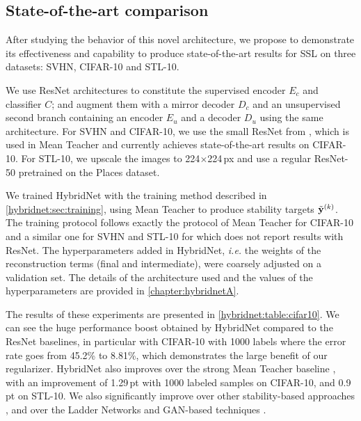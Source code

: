 \begin{table}
\begin{tabular}{@{}llrrrrrr@{}}
    \bottomrule
  \end{tabular}

  \label{hybridnet:table:cifar10}
\end{table}


\subsection{State-of-the-art comparison}
\label{hybridnet:sec:cifar10sota}

After studying the behavior of this novel architecture, we propose to demonstrate its effectiveness and capability to produce state-of-the-art results for \ac{SSL} on three datasets: SVHN, CIFAR-10 and STL-10.

We use ResNet architectures to constitute the supervised encoder $E_c$ and classifier $C$; and augment them with a mirror decoder $D_c$ and an unsupervised second branch containing an encoder $E_u$ and a decoder $D_u$ using the same architecture. For SVHN and CIFAR-10, we use the small ResNet from \citep{Gastaldi2017}, which is used in Mean Teacher \citep{Tarvainen2017} and currently achieves state-of-the-art results on CIFAR-10. For STL-10, we upscale the images to 224$\times$224\,px and use a regular ResNet-50 pretrained on the Places dataset.

We trained HybridNet with the training method described in \autoref{hybridnet:sec:training}, using Mean Teacher to produce stability targets $\tilde{\mathbf{y}}^{(k)}$. The training protocol follows exactly the protocol of Mean Teacher \citep{Tarvainen2017} for CIFAR-10 and a similar one for SVHN and STL-10 for which \citep{Tarvainen2017} does not report results with ResNet. The hyperparameters added in HybridNet, \textit{i.e.} the weights of the reconstruction terms (final and intermediate), were coarsely adjusted on a validation set. The details of the architecture used and the values of the hyperparameters are provided in \autoref{chapter:hybridnetA}.

The results of these experiments are presented in \autoref{hybridnet:table:cifar10}.
We can see the huge performance boost obtained by HybridNet compared to the ResNet baselines, in particular with CIFAR-10 with 1000 labels where the error rate goes from 45.2\% to 8.81\%, which demonstrates the large benefit of our regularizer. HybridNet also improves over the strong Mean Teacher baseline \citep{Tarvainen2017}, with an improvement of 1.29\,pt with 1000 labeled samples on CIFAR-10, and 0.9\,pt on STL-10. We also significantly improve over other stability-based approaches \citep{Sajjadi2016,Laine2016}, and over the Ladder Networks \citep{Rasmus2015} and GAN-based techniques \citep{Springenberg2015,Salimans2016}.

